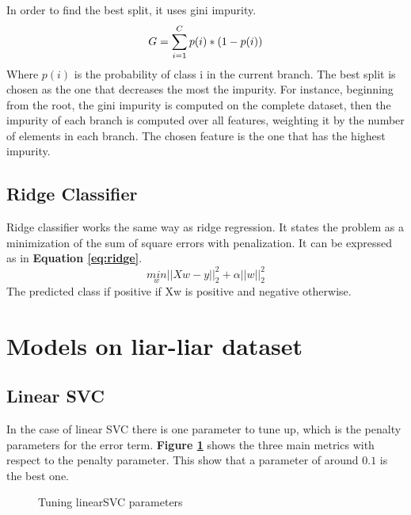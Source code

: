 In order to find the best split, it uses gini impurity. 
\begin{equation}
 G = \sum_{i=1}^C p(i) * (1-p(i))\\
\end{equation}
Where $p(i)$ is the probability of class i in the current branch. The best split is chosen as the one that decreases the most the impurity. For instance, beginning from the root, the gini impurity is computed on the complete dataset, then the impurity of each branch is computed over all features, weighting it by the number of elements in each branch. The chosen feature is the one that has the highest impurity. 
\subsection{Ridge Classifier}
Ridge classifier works the same way as ridge regression. It states the problem as a minimization of the sum of square errors with penalization. It can be expressed as in \textbf{Equation \ref{eq:ridge}}.
\begin{equation}
 \underset{w}{min} ||Xw-y||^2_2 + \alpha ||w||^2_2 \label{eq:ridge}
\end{equation}
The predicted class if positive if Xw is positive and negative otherwise. 
\section{Models on liar-liar dataset}
\subsection{Linear SVC}
In the case of linear SVC there is one parameter to tune up, which is the penalty parameters for the error term. \textbf{Figure \ref{fig:chap3:linearSVC}} shows the three main metrics with respect to the penalty parameter. This show that a parameter of around $0.1$ is the best one. 
\begin{figure}[]
 \centering
 \caption{Tuning linearSVC parameters }
 \label{fig:chap3:linearSVC}
\end{figure}
